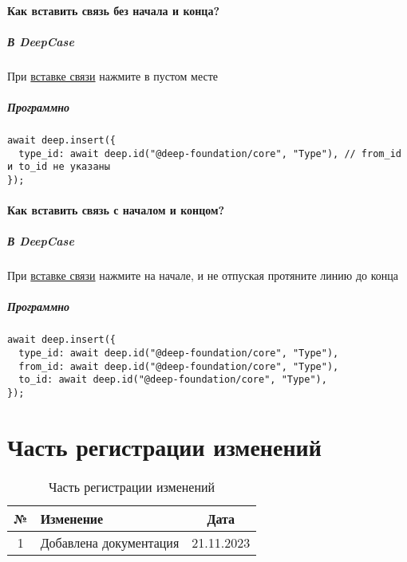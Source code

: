 \documentclass{article}
\begin{document}
\paragraph{Как вставить связь без начала и
  конца?}\hypertarget{FAQ.HowToInsertLinkWithoutFromAndTo}{}
\subparagraph{В DeepCase}
При \hyperlink{DeepCase.InsertLink.Description}{вставке связи} нажмите в пустом
месте
\subparagraph{Программно}
\begin{verbatim}
await deep.insert({
  type_id: await deep.id("@deep-foundation/core", "Type"), // from_id и to_id не указаны
});
\end{verbatim}
\paragraph{Как вставить связь с началом и
  концом?}\hypertarget{FAQ.HowToInsertLinkWithFromAndTo}{}
\subparagraph{В DeepCase}
При \hyperlink{DeepCase.InsertLink.Description}{вставке связи} нажмите на начале, и не отпуская протяните линию до конца
\subparagraph{Программно}
\begin{verbatim}
await deep.insert({
  type_id: await deep.id("@deep-foundation/core", "Type"), 
  from_id: await deep.id("@deep-foundation/core", "Type"),
  to_id: await deep.id("@deep-foundation/core", "Type"),
});
\end{verbatim}

\section{Часть регистрации изменений}

\begin{table}[h]
  \centering
  \caption{Часть регистрации изменений}
  \begin{tabular}{|c|p{8cm}|c|}
    \hline
    \textbf{№} & \textbf{Изменение}     & \textbf{Дата} \\
    \hline
    1          & Добавлена документация & 21.11.2023    \\
    \hline
  \end{tabular}
\end{table}
\end{document}
